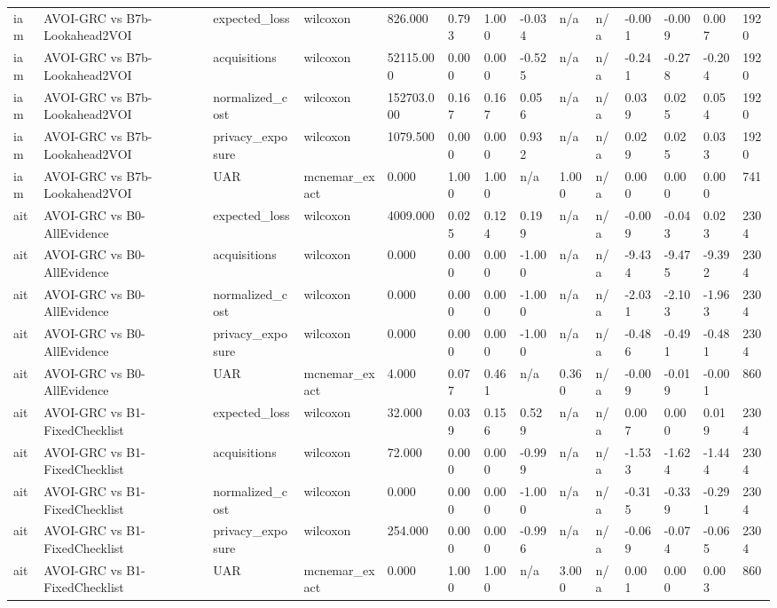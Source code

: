 \begin{table}[!ht]
{\begin{tabular}{llllllllllllll}
iam & AVOI-GRC vs B7b-Lookahead2VOI & expected\_loss & wilcoxon & 826.000 & 0.793 & 1.000 & -0.034 & n/a & n/a & -0.001 & -0.009 & 0.007 & 1920 \\
iam & AVOI-GRC vs B7b-Lookahead2VOI & acquisitions & wilcoxon & 52115.000 & 0.000 & 0.000 & -0.525 & n/a & n/a & -0.241 & -0.278 & -0.204 & 1920 \\
iam & AVOI-GRC vs B7b-Lookahead2VOI & normalized\_cost & wilcoxon & 152703.000 & 0.167 & 0.167 & 0.056 & n/a & n/a & 0.039 & 0.025 & 0.054 & 1920 \\
iam & AVOI-GRC vs B7b-Lookahead2VOI & privacy\_exposure & wilcoxon & 1079.500 & 0.000 & 0.000 & 0.932 & n/a & n/a & 0.029 & 0.025 & 0.033 & 1920 \\
iam & AVOI-GRC vs B7b-Lookahead2VOI & UAR & mcnemar\_exact & 0.000 & 1.000 & 1.000 & n/a & 1.000 & n/a & 0.000 & 0.000 & 0.000 & 741 \\
ait & AVOI-GRC vs B0-AllEvidence & expected\_loss & wilcoxon & 4009.000 & 0.025 & 0.124 & 0.199 & n/a & n/a & -0.009 & -0.043 & 0.023 & 2304 \\
ait & AVOI-GRC vs B0-AllEvidence & acquisitions & wilcoxon & 0.000 & 0.000 & 0.000 & -1.000 & n/a & n/a & -9.434 & -9.475 & -9.392 & 2304 \\
ait & AVOI-GRC vs B0-AllEvidence & normalized\_cost & wilcoxon & 0.000 & 0.000 & 0.000 & -1.000 & n/a & n/a & -2.031 & -2.103 & -1.963 & 2304 \\
ait & AVOI-GRC vs B0-AllEvidence & privacy\_exposure & wilcoxon & 0.000 & 0.000 & 0.000 & -1.000 & n/a & n/a & -0.486 & -0.491 & -0.481 & 2304 \\
ait & AVOI-GRC vs B0-AllEvidence & UAR & mcnemar\_exact & 4.000 & 0.077 & 0.461 & n/a & 0.360 & n/a & -0.009 & -0.019 & -0.001 & 860 \\
ait & AVOI-GRC vs B1-FixedChecklist & expected\_loss & wilcoxon & 32.000 & 0.039 & 0.156 & 0.529 & n/a & n/a & 0.007 & 0.000 & 0.019 & 2304 \\
ait & AVOI-GRC vs B1-FixedChecklist & acquisitions & wilcoxon & 72.000 & 0.000 & 0.000 & -0.999 & n/a & n/a & -1.533 & -1.624 & -1.444 & 2304 \\
ait & AVOI-GRC vs B1-FixedChecklist & normalized\_cost & wilcoxon & 0.000 & 0.000 & 0.000 & -1.000 & n/a & n/a & -0.315 & -0.339 & -0.291 & 2304 \\
ait & AVOI-GRC vs B1-FixedChecklist & privacy\_exposure & wilcoxon & 254.000 & 0.000 & 0.000 & -0.996 & n/a & n/a & -0.069 & -0.074 & -0.065 & 2304 \\
ait & AVOI-GRC vs B1-FixedChecklist & UAR & mcnemar\_exact & 0.000 & 1.000 & 1.000 & n/a & 3.000 & n/a & 0.001 & 0.000 & 0.003 & 860 \\

\end{tabular}}
\end{table}
